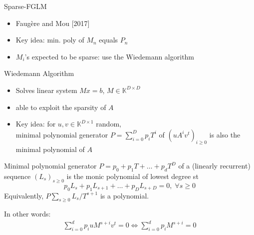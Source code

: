 \documentclass{beamer}
\begin{document}
\begin{frame}{Sparse-FGLM}
	\begin{itemize}
		\item Faug\`ere and Mou [2017]
		\item Key idea: min. poly of $M_n$ equals $P_n$
		\item $M_i$'s expected to be sparse: use the Wiedemann algorithm
	\end{itemize}
\end{frame}

\begin{frame}{Wiedemann Algorithm}
	\begin{itemize}
		\item Solves linear system $Mx = b$, $M \in \mathbb{K}^{D\times D}$
		\item able to exploit the sparsity of $A$
		\item Key idea: for $u,v \in \mathbb{K}^{D\times 1}$ random,\\
		minimal polynomial generator 
		$P = \sum_{i=0}^{D} p_i T^i$
		of $(u A^i v^{t})_{i\ge 0}$ is also the minimal polynomial of $A$
	\end{itemize}
	\pause
	\begin{definition}
		Minimal polynomial generator $P = p_0 + p_1 T + \dots + p_d T^D$ of a (linearly recurrent)
		sequence $(L_s)_{s\ge0}$ is the monic polynomial of lowest degree st 
		$$ p_0 L_s + p_1 L_{s+1} + \dots + p_D L_{s+D} = 0, \; \forall s \ge 0$$
		Equivalently, $P \sum_{s\ge 0} L_s/ T^{s+1}$ is a polynomial. 
	\end{definition}
	
	In other words:
	\begin{align*}
	\sum_{i=0}^{d}p_i u M^{s+i} v^{t} = 0 \iff \sum_{i=0}^{d}p_i M^{s+i}  = 0
	\end{align*}
\end{frame}
\end{document}
